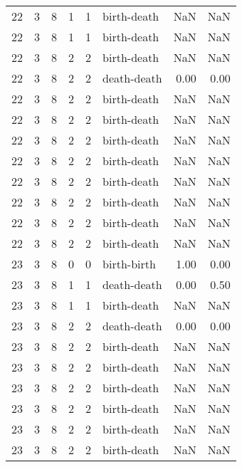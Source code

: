 \documentclass{article}
\begin{document}
\begin{center}
\begin{tabular}{rrrrrlrr}
22 & 3 & 8 & 1 & 1 & birth-death & NaN & NaN \\
22 & 3 & 8 & 1 & 1 & birth-death & NaN & NaN \\
22 & 3 & 8 & 2 & 2 & birth-death & NaN & NaN \\
22 & 3 & 8 & 2 & 2 & death-death & 0.00 & 0.00 \\
22 & 3 & 8 & 2 & 2 & birth-death & NaN & NaN \\
22 & 3 & 8 & 2 & 2 & birth-death & NaN & NaN \\
22 & 3 & 8 & 2 & 2 & birth-death & NaN & NaN \\
22 & 3 & 8 & 2 & 2 & birth-death & NaN & NaN \\
22 & 3 & 8 & 2 & 2 & birth-death & NaN & NaN \\
22 & 3 & 8 & 2 & 2 & birth-death & NaN & NaN \\
22 & 3 & 8 & 2 & 2 & birth-death & NaN & NaN \\
22 & 3 & 8 & 2 & 2 & birth-death & NaN & NaN \\
23 & 3 & 8 & 0 & 0 & birth-birth & 1.00 & 0.00 \\
23 & 3 & 8 & 1 & 1 & death-death & 0.00 & 0.50 \\
23 & 3 & 8 & 1 & 1 & birth-death & NaN & NaN \\
23 & 3 & 8 & 2 & 2 & death-death & 0.00 & 0.00 \\
23 & 3 & 8 & 2 & 2 & birth-death & NaN & NaN \\
23 & 3 & 8 & 2 & 2 & birth-death & NaN & NaN \\
23 & 3 & 8 & 2 & 2 & birth-death & NaN & NaN \\
23 & 3 & 8 & 2 & 2 & birth-death & NaN & NaN \\
23 & 3 & 8 & 2 & 2 & birth-death & NaN & NaN \\
23 & 3 & 8 & 2 & 2 & birth-death & NaN & NaN \\
\bottomrule
\end{tabular}


\end{center}
\end{document}
